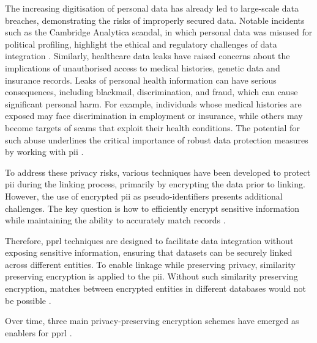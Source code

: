 The increasing digitisation of personal data has already led to large-scale data breaches, demonstrating the risks of improperly secured data. 
Notable incidents such as the Cambridge Analytica scandal, in which personal data was misused for political profiling, highlight the ethical and regulatory challenges of data integration \cite{isaak2018user}. 
Similarly, healthcare data leaks have raised concerns about the implications of unauthorised access to medical histories, genetic data and insurance records.
Leaks of personal health information can have serious consequences, including blackmail, discrimination, and fraud, which can cause significant personal harm. 
For example, individuals whose medical histories are exposed may face discrimination in employment or insurance, while others may become targets of scams that exploit their health conditions. 
The potential for such abuse underlines the critical importance of robust data protection measures by working with \ac{pii} \cite{smith2016examining}.

To address these privacy risks, various techniques have been developed to protect \ac{pii} during the linking process, primarily by encrypting the data prior to linking. 
However, the use of encrypted \ac{pii} as pseudo-identifiers presents additional challenges.
The key question is how to efficiently encrypt sensitive information while maintaining the ability to accurately match records \cite{schnell2009privacy}.

Therefore, \ac{pprl} techniques are designed to facilitate data integration without exposing sensitive information, ensuring that datasets can be securely linked across different entities.
To enable linkage while preserving privacy, similarity preserving encryption is applied to the \ac{pii}.
Without such similarity preserving encryption, matches between encrypted entities in different databases would not be possible \cite{schnell2009privacy, vatsalan2017privacy}.

Over time, three main privacy-preserving encryption schemes have emerged as enablers for \ac{pprl} \cite{vidanage2020graph, schaefer2024}.

